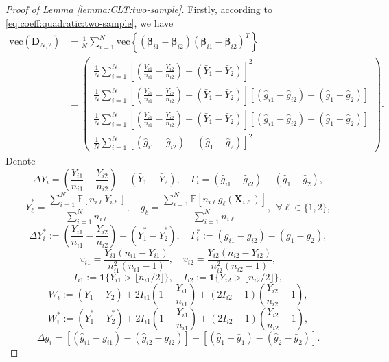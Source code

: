 \documentclass[12pt,letterpaper]{article}
\begin{document}
\begin{proof}[Proof of Lemma \ref{lemma:CLT:two-sample}]
Firstly, according to \eqref{eq:coeff:quadratic:two-sample}, we have 
\begin{equation}\label{eq:D:N:2:expand}
\begin{array}{rl}
    \mathrm{vec}\left(\mathbf{D}_{N,2}\right)\!\!\!\!&\displaystyle=\frac{1}{N}\sum_{i=1}^N\mathrm{vec}\left\{(\boldsymbol{\beta}_{i1}-\boldsymbol{\beta}_{i2})(\boldsymbol{\beta}_{i1}-\boldsymbol{\beta}_{i2})^T\right\}\\
    &\displaystyle=\begin{pmatrix}
        \displaystyle\frac{1}{N}\sum_{i=1}^N\left[\left(\frac{Y_{i1}}{n_{i1}}-\frac{Y_{i2}}{n_{i2}}\right)-(\bar{Y}_1-\bar{Y}_2)\right]^2\\
        \displaystyle\frac{1}{N}\sum_{i=1}^N\left[\left(\frac{Y_{i1}}{n_{i1}}-\frac{Y_{i2}}{n_{i2}}\right)-(\bar{Y}_1-\bar{Y}_2)\right][(\hat{g}_{i1}-\hat{g}_{i2})-(\hat{g}_1-\hat{g}_2)]\\
        \displaystyle\frac{1}{N}\sum_{i=1}^N\left[\left(\frac{Y_{i1}}{n_{i1}}-\frac{Y_{i2}}{n_{i2}}\right)-(\bar{Y}_1-\bar{Y}_2)\right][(\hat{g}_{i1}-\hat{g}_{i2})-(\hat{g}_1-\hat{g}_2)]\\
        \displaystyle\frac{1}{N}\sum_{i=1}^N[(\hat{g}_{i1}-\hat{g}_{i2})-(\hat{g}_1-\hat{g}_2)]^2
    \end{pmatrix}.
\end{array}
\end{equation}
Denote
$$\Delta Y_i=\left(\frac{Y_{i1}}{n_{i1}}-\frac{Y_{i2}}{n_{i2}}\right)-(\bar{Y}_1-\bar{Y}_2),\quad \Gamma_i=(\hat{g}_{i1}-\hat{g}_{i2})-(\hat{g}_1-\hat{g}_2),$$
$$\bar{Y}_\ell^*=\frac{\sum_{i=1}^N\mathbb{E}[n_{i\ell}Y_{i\ell}]}{\sum_{i=1}^Nn_{i\ell}},\quad \bar{g}_{\ell}=\frac{\sum_{i=1}^N\mathbb{E}[n_{i\ell}g_{\ell}(\mathbf{X}_{i\ell})]}{\sum_{i=1}^Nn_{i\ell}},\ \ \forall \ell\in\{1,2\},$$
$$\Delta Y_i^*:=\left(\frac{Y_{i1}}{n_{i1}}-\frac{Y_{i2}}{n_{i2}}\right)-(\bar{Y}_1^*-\bar{Y}_2^*),\quad \Gamma_i^*:=(g_{i1}-g_{i2})-(\bar{g}_1-\bar{g}_2),$$
$$v_{i1}=\frac{Y_{i1}(n_{i1}-Y_{i1})}{n_{i1}^2(n_{i1}-1)},\quad v_{i2}=\frac{Y_{i2}(n_{i2}-Y_{i2})}{n_{i2}^2(n_{i2}-1)},$$
$$I_{i1}:=\mathbf{1}\{Y_{i1}>\lfloor n_{i1}/2\rfloor\},\quad I_{i2}:=\mathbf{1}\{Y_{i2}>\lfloor n_{i2}/2\rfloor\},$$
$$W_i:=(\bar{Y}_1-\bar{Y}_2)+2I_{i1}\left(1-\frac{Y_{i1}}{n_{i1}}\right)+(2I_{i2}-1)\left(\frac{Y_{i2}}{n_{i2}}-1\right),$$
$$W_i^*:=(\bar{Y}_1^*-\bar{Y}_2^*)+2I_{i1}\left(1-\frac{Y_{i1}}{n_{i1}}\right)+(2I_{i2}-1)\left(\frac{Y_{i2}}{n_{i2}}-1\right),$$
$$\Delta g_i=[(\hat{g}_{i1}-g_{i1})-(\hat{g}_{i2}-g_{i2})]-[(\hat{g}_1-\bar{g}_1)-(\hat{g}_2-\bar{g}_2)].$$

\end{proof}
\end{document}

